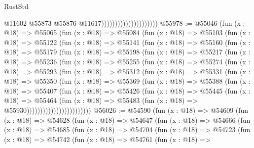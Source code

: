 \begin{lexlean}{RustStd}
\begin{coremodule}
                                              @11602
                                              @55873
                                              @55876
                                              @11617)))))))))))))))))))))
@55978 := @55046
    (fun (x : @18) =>
    @55065
      (fun (x : @18) =>
      @55084
        (fun (x : @18) =>
        @55103
          (fun (x : @18) =>
          @55122
            (fun (x : @18) =>
            @55141
              (fun (x : @18) =>
              @55160
                (fun (x : @18) =>
                @55179
                  (fun (x : @18) =>
                  @55198
                    (fun (x : @18) =>
                    @55217
                      (fun (x : @18) =>
                      @55236
                        (fun (x : @18) =>
                        @55255
                          (fun (x : @18) =>
                          @55274
                            (fun (x : @18) =>
                            @55293
                              (fun (x : @18) =>
                              @55312
                                (fun (x : @18) =>
                                @55331
                                  (fun (x : @18) =>
                                  @55350
                                    (fun (x : @18) =>
                                    @55369
                                      (fun (x : @18) =>
                                      @55388
                                        (fun (x : @18) =>
                                        @55407
                                          (fun (x : @18) =>
                                          @55426
                                            (fun (x : @18) =>
                                            @55445
                                              (fun (x : @18) =>
                                              @55464
                                                (fun (x : @18) =>
                                                @55483
                                                  (fun (x : @18) => @55930))))))))))))))))))))))))
@56026 := @54590
    (fun (x : @18) =>
    @54609
      (fun (x : @18) =>
      @54628
        (fun (x : @18) =>
        @54647
          (fun (x : @18) =>
          @54666
            (fun (x : @18) =>
            @54685
              (fun (x : @18) =>
              @54704
                (fun (x : @18) =>
                @54723
                  (fun (x : @18) =>
                  @54742
                    (fun (x : @18) =>
                    @54761
                      (fun (x : @18) =>

\end{coremodule}
\end{lexlean}
